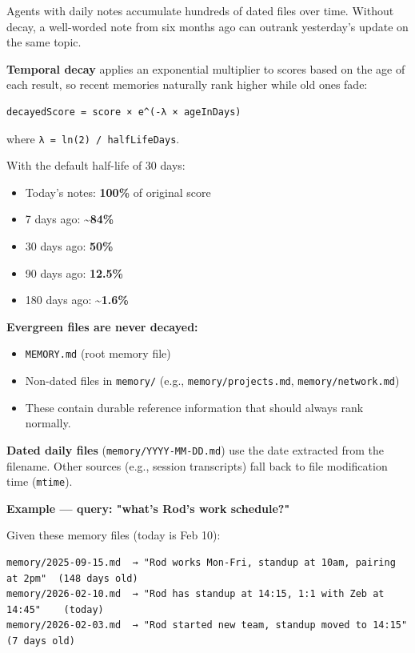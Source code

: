Agents with daily notes accumulate hundreds of dated files over time. Without decay,
a well-worded note from six months ago can outrank yesterday's update on the same topic.

\textbf{Temporal decay} applies an exponential multiplier to scores based on the age of each result,
so recent memories naturally rank higher while old ones fade:

\begin{lstlisting}
decayedScore = score × e^(-λ × ageInDays)
\end{lstlisting}


where \texttt{λ = ln(2) / halfLifeDays}.

With the default half-life of 30 days:

\begin{itemize}
  \item Today's notes: \textbf{100\%} of original score
  \item 7 days ago: \textbf{\textasciitilde{}84\%}
  \item 30 days ago: \textbf{50\%}
  \item 90 days ago: \textbf{12.5\%}
  \item 180 days ago: \textbf{\textasciitilde{}1.6\%}
\end{itemize}


\textbf{Evergreen files are never decayed:}

\begin{itemize}
  \item \texttt{MEMORY.md} (root memory file)
  \item Non-dated files in \texttt{memory/} (e.g., \texttt{memory/projects.md}, \texttt{memory/network.md})
  \item These contain durable reference information that should always rank normally.
\end{itemize}


\textbf{Dated daily files} (\texttt{memory/YYYY-MM-DD.md}) use the date extracted from the filename.
Other sources (e.g., session transcripts) fall back to file modification time (\texttt{mtime}).

\textbf{Example — query: "what's Rod's work schedule?"}

Given these memory files (today is Feb 10):

\begin{lstlisting}
memory/2025-09-15.md  → "Rod works Mon-Fri, standup at 10am, pairing at 2pm"  (148 days old)
memory/2026-02-10.md  → "Rod has standup at 14:15, 1:1 with Zeb at 14:45"    (today)
memory/2026-02-03.md  → "Rod started new team, standup moved to 14:15"        (7 days old)
\end{lstlisting}


